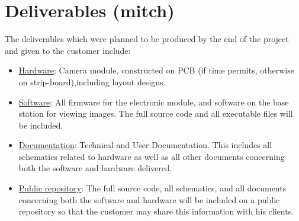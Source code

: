 \section{Deliverables (mitch)}

The deliverables which were planned to be produced by the end of the project and given to the customer include:

\begin{itemize}
	\item \underline{Hardware}: Camera module, constructed on PCB (if time permits, otherwise on strip-board),including layout designs.
	\item \underline{Software}: All firmware for the electronic module, and software on the base station for viewing images. The full source code and all executable files will be included.
	\item \underline{Documentation}: Technical and User Documentation. This includes all schematics related to hardware as well as all other documents concerning both the software and hardware delivered.
	\item \underline{Public repository}: The full source code, all schematics, and all documents concerning both the software and hardware will be included on a public repository so that the customer may share this information with his clients.
\end{itemize}

